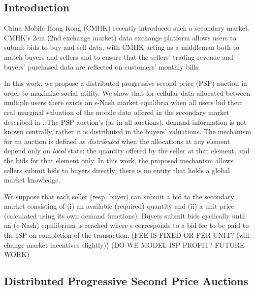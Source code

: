 \documentclass[12pt]{article}
\theoremstyle{definition}
\begin{document}
\begin{multicols}{2}

\section{Introduction}
China Mobile Hong Kong (CMHK) recently introduced such a secondary market.
CMHK’s 2cm (2nd exchange market) data exchange platform allows users to submit
bids to buy and sell data, with CMHK acting as a middleman both to match buyers
and sellers and to ensure that the sellers’ trading revenue and buyers’
purchased data are reflected on customers’ monthly bills. \cite{zheng}

In this work, we propose a distributed progressive second price (PSP) auction in
order to maximize social utility. We show that for cellular data allocated between multiple users there
exists an $\epsilon$-Nash market equilibria when all users bid their real marginal
valuation of the mobile data offered in the secondary market described in
\cite{zheng}. The PSP auction's (as in all auctions),
demand information is not known centrally, rather it is distributed in the
buyers' valuations. The mechanism for an auction is defined
as \emph{distributed} when the allocations at any element depend only on
\emph{local} state: the quantity offered by the seller at that element, and the
bids for that element only. In this work, the proposed mechanism allows sellers submit bids to buyers
directly; there is no entity that holds a global market knowledge.

We suppose that each seller (resp. buyer) can submit a bid to the secondary
market consisting of (i) an available (required) quantity and (ii) a unit-price (calculated
using its own demand functions). Buyers submit bids cyclically until an
($\epsilon$-Nash) equilibrium is reached where $\epsilon$ corresponds to a bid
fee to be paid to the ISP on completion of the transaction. (FEE IS FIXED OR
PER-UNIT? (will change market incentives slightly))
(DO WE MODEL ISP PROFIT? FUTURE WORK)

\subsection{Distributed Progressive Second Price Auctions}


\end{multicols}
\end{document}

